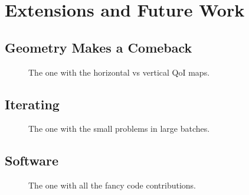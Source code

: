 \section{Extensions and Future Work}


\subsection{Geometry Makes a Comeback}

\begin{frame}[t]
\centering
\begin{figure}
\centering

The one with the horizontal vs vertical QoI maps.

\end{figure}

\end{frame}


\subsection{Iterating}

\begin{frame}[t]
\centering
\begin{figure}
\centering

The one with the small problems in large batches.

\end{figure}

\end{frame}


\subsection{Software}

\begin{frame}[t]
\centering
\begin{figure}
\centering

The one with all the fancy code contributions.

\end{figure}

\end{frame}


